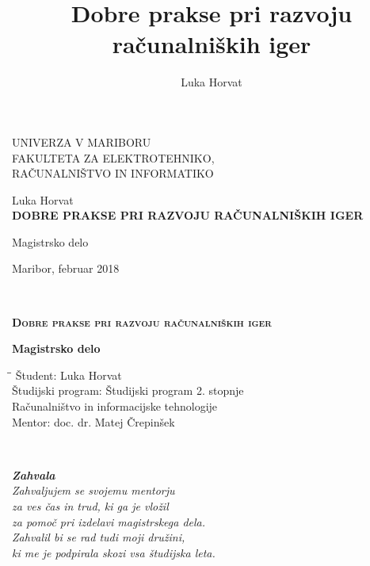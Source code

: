 \documentclass[12pt,a4paper,twoside]{book}
\author{Luka Horvat}
\title{Dobre prakse pri razvoju računalniških iger}
\begin{document}
	
\thispagestyle{empty} 
\begin{center}
	{\large 
		UNIVERZA V MARIBORU\\
		FAKULTETA ZA ELEKTROTEHNIKO,\\
		RAČUNALNIŠTVO IN INFORMATIKO\\
	}
	
	\vspace{\fill}
	{\LARGE Luka Horvat}\\
	
	\vspace{1cm}
	\textsc{\textbf{\LARGE DOBRE PRAKSE PRI RAZVOJU RAČUNALNIŠKIH IGER\\}}
	
	\vspace{1cm}
	{\LARGE Magistrsko delo}
	
	\vfill
	{\Large Maribor, februar 2018}
	\newpage
\end{center}

\ \thispagestyle{empty}
\newpage

\thispagestyle{empty} 
\begin{center}	
	\vspace*{\fill}
	\textsc{\textbf{\LARGE
			Dobre prakse pri razvoju računalniških iger\\
	}}
	{\large\textbf{Magistrsko delo\\}
		
	}
	\vspace{\fill}
	\begin{tabbing}
		\hspace*{4cm}\=\hspace*{3cm}\= \kill
		Študent: \> Luka Horvat\\
		Študijski program: \> Študijski program 2. stopnje\\
		\>Računalništvo in informacijske tehnologije\\
		Mentor: \> doc. dr. Matej Črepinšek
	\end{tabbing}
\end{center}
\newpage

\ \thispagestyle{empty}
\newpage


\mbox{}
{\raggedleft\vfill\itshape%
		\textbf{Zahvala}\\
		Zahvaljujem se svojemu mentorju \\za ves čas in trud, ki ga je vložil \\za pomoč pri izdelavi magistrskega dela. \\
		Zahvalil bi se rad tudi moji družini,\\ki me je podpirala skozi vsa študijska leta.  \\
	}\par
\end{document}
